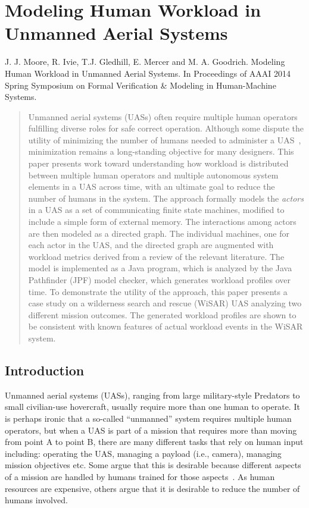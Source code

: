 \chapter{Modeling Human Workload in Unmanned Aerial Systems}\label{ch:workload_paper}
\noindent J. J. Moore, R. Ivie, T.J. Gledhill, E. Mercer and M. A. Goodrich. Modeling Human Workload in Unmanned Aerial Systems. In Proceedings of AAAI 2014 Spring Symposium on Formal Verification \& Modeling in Human-Machine Systems.

\begin{abstract}
Unmanned aerial systems (UASs) often require multiple human operators fulfilling diverse roles for safe correct operation.  Although some dispute the utility of minimizing the number of humans needed to administer a UAS~\cite{MurphyBurke2010}, minimization remains a long-standing objective for many designers.  This paper presents work toward understanding how workload is distributed between multiple human operators and multiple autonomous system elements in a UAS across time, with an ultimate goal to reduce the number of humans in the system. The approach formally models the {\em actors} in a UAS as a set of communicating finite state machines, modified to include a simple form of external memory. The interactions among actors are then modeled as a directed graph.  The individual machines, one for each actor in the UAS, and the directed graph are augmented with workload metrics derived from a review of the relevant literature. The model is implemented as a Java program, which is analyzed by the Java Pathfinder (JPF) model checker, which generates workload profiles over time.  To demonstrate the utility of the approach, this paper presents a case study on a wilderness search and rescue (WiSAR) UAS analyzing two different mission outcomes. The generated workload profiles are shown to be consistent with known features of actual workload events in the WiSAR system. 
\end{abstract}

\noindent
\section{Introduction}

Unmanned aerial systems (UASs), ranging from large military-style Predators to small civilian-use hovercraft, usually require more than one human to operate.  It is perhaps ironic that a so-called ``unmanned'' system requires multiple human operators, but when a UAS is part of a mission that requires more than moving from point A to point B, there are many different tasks that rely on human input including: operating the UAS, managing a payload (i.e., camera), managing mission objectives etc.  Some argue that this is desirable because different aspects of a mission are handled by humans trained for those aspects~\cite{MurphyBurke2010}. As human resources are expensive, others argue that it is desirable to reduce the number of humans involved.

